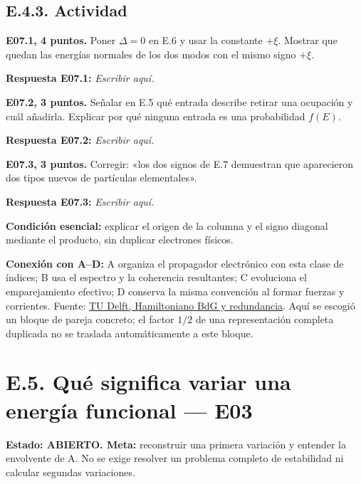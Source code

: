 \documentclass[
  spanish,
  10pt,
  a4paper,
]{article}
\begin{document}
\subsection{E.4.3. Actividad}\label{e.4.3.-actividad}


\textbf{E07.1, 4 puntos.} Poner \(\Delta=0\) en E.6 y usar la constante
\(+\xi\). Mostrar que quedan las energías normales de los dos modos con
el mismo signo \(+\xi\).

\textbf{Respuesta E07.1:} \emph{Escribir aquí.}


\textbf{E07.2, 3 puntos.} Señalar en E.5 qué entrada describe retirar
una ocupación y cuál añadirla. Explicar por qué ninguna entrada es una
probabilidad \(f(E)\).

\textbf{Respuesta E07.2:} \emph{Escribir aquí.}


\textbf{E07.3, 3 puntos.} Corregir: «los dos signos de E.7 demuestran
que aparecieron dos tipos nuevos de partículas elementales».

\textbf{Respuesta E07.3:} \emph{Escribir aquí.}

\textbf{Condición esencial:} explicar el origen de la columna y el signo
diagonal mediante el producto, sin duplicar electrones físicos.

\textbf{Conexión con A--D:} A organiza el propagador electrónico con
esta clase de índices; B usa el espectro y la coherencia resultantes; C
evoluciona el emparejamiento efectivo; D conserva la misma convención al
formar fuerzas y corrientes. Fuente:
\href{https://topocondmat.org/test/w1_topointro/0d.html}{TU Delft,
Hamiltoniano BdG y redundancia}. Aquí se escogió un bloque de pareja
concreto; el factor \(1/2\) de una representación completa duplicada no
se traslada automáticamente a este bloque.


\section{E.5. Qué significa variar una energía funcional ---
E03}\label{e.5.-quuxe9-significa-variar-una-energuxeda-funcional-e03}

\textbf{Estado: ABIERTO. Meta:} reconstruir una primera variación y
entender la envolvente de A. No se exige resolver un problema completo
de estabilidad ni calcular segundas variaciones.
\end{document}
